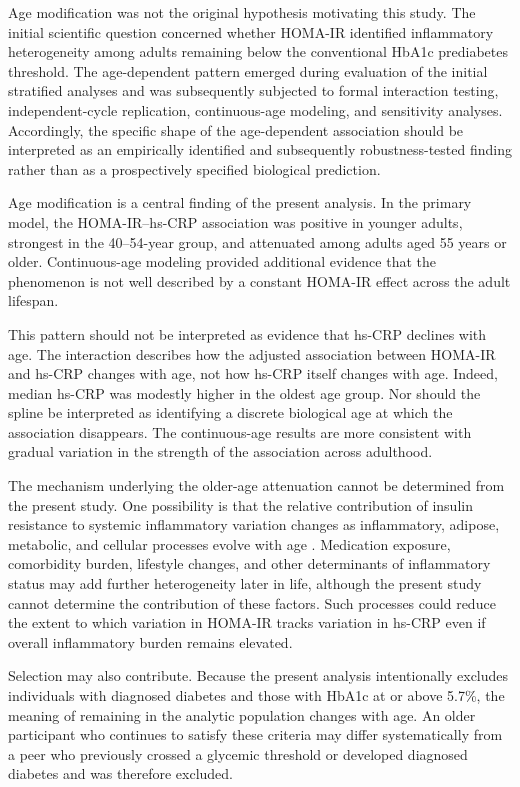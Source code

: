 \documentclass[11pt]{article}
\begin{document}
Age modification was not the original hypothesis motivating this study.
The initial scientific question concerned whether HOMA-IR identified
inflammatory heterogeneity among adults remaining below the conventional
HbA1c prediabetes threshold. The age-dependent pattern emerged during
evaluation of the initial stratified analyses and was subsequently subjected
to formal interaction testing, independent-cycle replication,
continuous-age modeling, and sensitivity analyses. Accordingly, the
specific shape of the age-dependent association should be interpreted as
an empirically identified and subsequently robustness-tested finding rather
than as a prospectively specified biological prediction.

Age modification is a central finding of the present analysis. In the
primary model, the HOMA-IR--hs-CRP association was positive in younger
adults, strongest in the 40--54-year group, and attenuated among adults
aged 55 years or older. Continuous-age modeling provided additional evidence
that the phenomenon is not well described by a constant HOMA-IR effect
across the adult lifespan.

This pattern should not be interpreted as evidence that hs-CRP declines
with age. The interaction describes how the adjusted association between
HOMA-IR and hs-CRP changes with age, not how hs-CRP itself changes with
age. Indeed, median hs-CRP was modestly higher in the oldest age group.
Nor should the spline be interpreted as identifying a discrete biological
age at which the association disappears. The continuous-age results are
more consistent with gradual variation in the strength of the association
across adulthood.

The mechanism underlying the older-age attenuation cannot be determined
from the present study. One possibility is that the relative contribution
of insulin resistance to systemic inflammatory variation changes as
inflammatory, adipose, metabolic, and cellular processes evolve with age
\citep{Park2014AgingIR}. Medication exposure, comorbidity burden, lifestyle
changes, and other determinants of inflammatory status may add further
heterogeneity later in life, although the present study cannot determine
the contribution of these factors. Such processes could reduce the extent
to which variation in HOMA-IR tracks variation in hs-CRP even if overall
inflammatory burden remains elevated.

Selection may also contribute. Because the present analysis intentionally
excludes individuals with diagnosed diabetes and those with HbA1c at or
above 5.7\%, the meaning of remaining in the analytic population changes
with age. An older participant who continues to satisfy these criteria may
differ systematically from a peer who previously crossed a glycemic
threshold or developed diagnosed diabetes and was therefore excluded.
\end{document}
